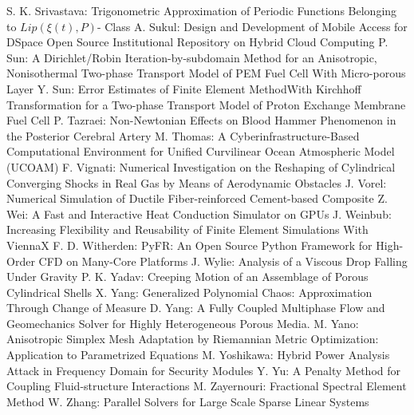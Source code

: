 \documentclass[10pt, A4]{article}%
\begin{document}
{S. K. Srivastava}: {Trigonometric Approximation of Periodic Functions Belonging to $Lip(\xi(t), P)$- Class}
{A. Sukul}: {Design and Development of Mobile Access for DSpace Open Source Institutional Repository on Hybrid Cloud Computing}
{P. Sun}: {A Dirichlet/Robin Iteration-by-subdomain Method for an Anisotropic, Nonisothermal Two-phase Transport Model of PEM Fuel Cell With Micro-porous Layer}
{Y. Sun}: {Error Estimates of Finite Element MethodWith Kirchhoff Transformation for a Two-phase Transport Model of Proton Exchange Membrane Fuel Cell}
{P. Tazraei}: {Non-Newtonian Effects on Blood Hammer Phenomenon in the Posterior Cerebral Artery}
{M. Thomas}: {A Cyberinfrastructure-Based Computational Environment for Unified Curvilinear Ocean Atmospheric Model  (UCOAM)}
{F. Vignati}: {Numerical Investigation on the Reshaping of Cylindrical Converging Shocks in Real Gas by Means of Aerodynamic Obstacles}
{J. Vorel}: {Numerical Simulation of Ductile Fiber-reinforced Cement-based Composite}
{Z. Wei}: {A Fast and Interactive Heat Conduction Simulator on GPUs}
{J. Weinbub}: {Increasing Flexibility and Reusability of Finite Element Simulations With ViennaX}
{F. D. Witherden}: {PyFR: An Open Source Python Framework for High-Order CFD on Many-Core Platforms}
{J. Wylie}: {Analysis of a Viscous Drop Falling Under Gravity}
{P. K. Yadav}: {Creeping Motion of an Assemblage of Porous Cylindrical Shells}
{X. Yang}: {Generalized Polynomial Chaos: Approximation Through Change of Measure}
{D. Yang}: {A Fully Coupled Multiphase Flow and Geomechanics Solver for Highly Heterogeneous Porous Media.}
{M. Yano}: {Anisotropic Simplex Mesh Adaptation by Riemannian Metric Optimization: Application to Parametrized Equations}
{M. Yoshikawa}: {Hybrid Power Analysis Attack in Frequency Domain for Security Modules}
{Y. Yu}: {A Penalty Method for Coupling Fluid-structure Interactions}
{M. Zayernouri}: {Fractional Spectral Element Method}
{W. Zhang}: {Parallel Solvers for Large Scale Sparse Linear Systems}
\end{document}
